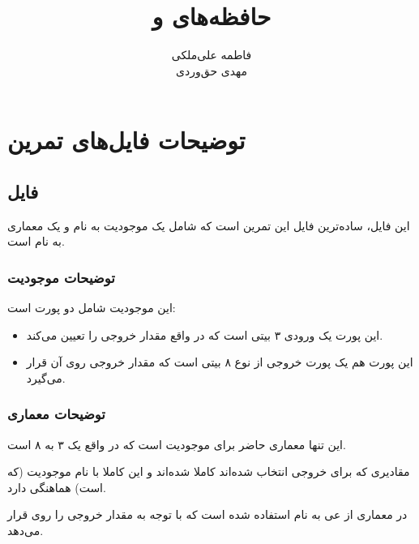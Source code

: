 \documentclass[dvipsnames, svgnames, x11names, a4paper, 11pt]{article}
\title{حافظه‌های \lr{ROM} و \lr{BRAM}}
\author{
فاطمه علی‌ملکی \\
مهدی حق‌وردی
}
\begin{document}
\maketitle
\tableofcontents

\section{توضیحات فایل‌های تمرین}
\subsection{فایل }
این فایل، ساده‌ترین فایل این تمرین است که شامل یک موجودیت به نام
و یک معماری به نام 
است.

\subsubsection{توضیحات موجودیت }
این موجودیت شامل دو پورت است:
\begin{itemize}
\item 
{}

این پورت یک ورودی 
۳ بیتی است که در واقع مقدار خروجی را تعیین می‌کند.

\item 
{}

این پورت هم یک پورت خروجی از نوع 
۸ بیتی است که مقدار خروجی روی آن قرار می‌گیرد.
\end{itemize}

\subsubsection{توضیحات معماری }
این تنها معماری حاضر برای موجودیت 
است که در واقع یک  ۳ به ۸ است.

مقادیری که برای خروجی انتخاب شده‌اند کاملا  شده‌اند و این کاملا با نام موجودیت (که  است) هماهنگی دارد.

در معماری از 
عی به نام 
استفاده شده است که با توجه به مقدار 
خروجی را روی 
قرار می‌دهد.
\end{document}

